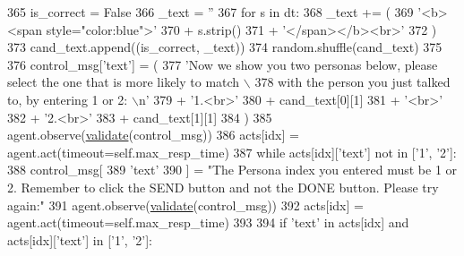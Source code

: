 \begin{DoxyCode}
365                                 is\_correct = \textcolor{keyword}{False}
366                             \_text = \textcolor{stringliteral}{''}
367                             \textcolor{keywordflow}{for} s \textcolor{keywordflow}{in} dt:
368                                 \_text += (
369                                     \textcolor{stringliteral}{'<b><span style="color:blue">'}
370                                     + s.strip()
371                                     + \textcolor{stringliteral}{'</span></b><br>'}
372                                 )
373                             cand\_text.append((is\_correct, \_text))
374                         random.shuffle(cand\_text)
375 
376                         control\_msg[\textcolor{stringliteral}{'text'}] = (
377                             \textcolor{stringliteral}{'Now we show you two personas below, please select the one that is more likely
       to match \(\backslash\)}
378 \textcolor{stringliteral}{                                               with the person you just talked to, by entering 1 or 2: \(\backslash\)n'}
379                             + \textcolor{stringliteral}{'1.<br>'}
380                             + cand\_text[0][1]
381                             + \textcolor{stringliteral}{'<br>'}
382                             + \textcolor{stringliteral}{'2.<br>'}
383                             + cand\_text[1][1]
384                         )
385                         agent.observe(\hyperlink{namespaceparlai_1_1core_1_1worlds_afc3fad603b7bce41dbdc9cdc04a9c794}{validate}(control\_msg))
386                         acts[idx] = agent.act(timeout=self.max\_resp\_time)
387                         \textcolor{keywordflow}{while} acts[idx][\textcolor{stringliteral}{'text'}] \textcolor{keywordflow}{not} \textcolor{keywordflow}{in} [\textcolor{stringliteral}{'1'}, \textcolor{stringliteral}{'2'}]:
388                             control\_msg[
389                                 \textcolor{stringliteral}{'text'}
390                             ] = \textcolor{stringliteral}{"The Persona index you entered must be 1 or 2. Remember to click the SEND
       button and not the DONE button. Please try again:"}
391                             agent.observe(\hyperlink{namespaceparlai_1_1core_1_1worlds_afc3fad603b7bce41dbdc9cdc04a9c794}{validate}(control\_msg))
392                             acts[idx] = agent.act(timeout=self.max\_resp\_time)
393 
394                         \textcolor{keywordflow}{if} \textcolor{stringliteral}{'text'} \textcolor{keywordflow}{in} acts[idx] \textcolor{keywordflow}{and} acts[idx][\textcolor{stringliteral}{'text'}] \textcolor{keywordflow}{in} [\textcolor{stringliteral}{'1'}, \textcolor{stringliteral}{'2'}]:

\end{DoxyCode}
